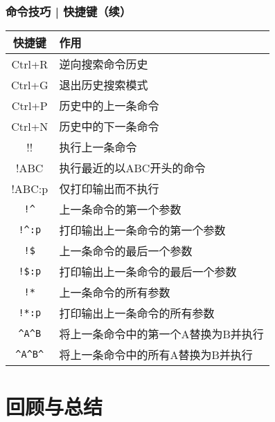 \begin{frame}[fragile]
  \frametitle{命令技巧 | 快捷键（续）}
  \begin{table}
    \centering
    \begin{tabularx}{0.8\textwidth}{cX}
      \hline
      \rowcolor{blue!50}快捷键 & 作用\\
      \hline
      \alert{Ctrl+R} & 逆向搜索命令历史\\
      Ctrl+G & 退出历史搜索模式\\
      \hline
      Ctrl+P & 历史中的上一条命令\\
      Ctrl+N & 历史中的下一条命令\\
      \hline
      \alert{!!} & 执行上一条命令\\
      !ABC & 执行最近的以ABC开头的命令\\
      !ABC:p & 仅打印输出而不执行\\
      \hline
      \verb|!^| & 上一条命令的第一个参数\\
      \verb|!^:p| & 打印输出上一条命令的第一个参数\\
      \verb|!$| & 上一条命令的最后一个参数\\
      \verb|!$:p| & 打印输出上一条命令的最后一个参数\\
      \verb|!*| & 上一条命令的所有参数\\
      \verb|!*:p| & 打印输出上一条命令的所有参数\\
      \hline
      \verb|^A^B| & 将上一条命令中的第一个A替换为B并执行\\
      \verb|^A^B^| & 将上一条命令中的所有A替换为B并执行\\
      \hline
    \end{tabularx}
  \end{table}
\end{frame}

\section{回顾与总结}
